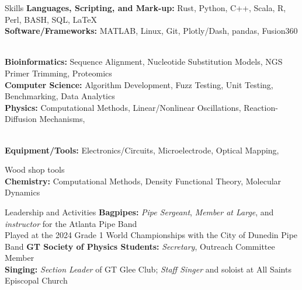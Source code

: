 \documentclass{resume} %
\begin{document}
\begin{rSection}{Skills}
  \textbf{Languages, Scripting, and Mark-up:} Rust, Python, C++, Scala, R, Perl, BASH, SQL, LaTeX \\
  \textbf{Software/Frameworks:} MATLAB, Linux, Git, Plotly/Dash, pandas, Fusion360 \\
  \textbf{Bioinformatics:} Sequence Alignment, Nucleotide Substitution Models, NGS Primer Trimming, Proteomics \\
  \textbf{Computer Science:} Algorithm Development, Fuzz Testing, Unit Testing, Benchmarking, Data Analytics \\
  \textbf{Physics:} Computational Methods, Linear/Nonlinear Oscillations, Reaction-Diffusion Mechanisms,\\
  \textbf{Equipment/Tools:} Electronics/Circuits, Microelectrode, Optical Mapping, Wood shop tools\\
  \textbf{Chemistry:} Computational Methods, Density Functional Theory, Molecular Dynamics 
\end{rSection}
\begin{rSection}{Leadership and Activities}
  \textbf{Bagpipes:} \textit{Pipe Sergeant}, \textit{Member at Large}, and \textit{instructor} for the Atlanta Pipe Band \\
  \-\hspace{2cm} Played at the 2024 Grade 1 World Championships with the City of Dunedin Pipe Band
  \textbf{GT Society of Physics Students:} \textit{Secretary}, Outreach Committee Member \\
  \textbf{Singing:} \textit{Section Leader} of GT Glee Club; \textit{Staff Singer} and soloist at All Saints Episcopal Church  \\

\end{rSection}
\end{document}
